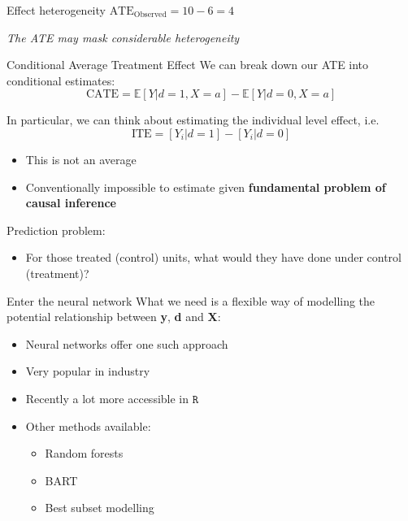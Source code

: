 \documentclass[
  ignorenonframetext,
]{beamer}
\providecommand{\tightlist}{%
  \setlength{\itemsep}{0pt}\setlength{\parskip}{0pt}}
\begin{document}
\begin{frame}{Effect heterogeneity}
\centering \(\text{ATE}_{\text{Observed}} = 10 - 6 = 4\)

\emph{The ATE may mask considerable heterogeneity}
\end{frame}

\begin{frame}{Conditional Average Treatment Effect}
\protect\hypertarget{conditional-average-treatment-effect}{}
We can break down our ATE into conditional estimates: \[
\text{CATE} = \mathbb{E}[Y|d = 1, X=a] - \mathbb{E}[Y|d = 0, X=a]
\]

In particular, we can think about estimating the individual level
effect, i.e. \[
\text{ITE} = [Y_i|d=1] - [Y_i|d = 0]
\]

\begin{itemize}
\tightlist
\item
  This is not an average
\item
  Conventionally impossible to estimate given \textbf{fundamental
  problem of causal inference}
\end{itemize}

Prediction problem:

\begin{itemize}
\tightlist
\item
  For those treated (control) units, what would they have done under
  control (treatment)?
\end{itemize}
\end{frame}

\begin{frame}{Enter the neural network}
\protect\hypertarget{enter-the-neural-network}{}
What we need is a flexible way of modelling the potential relationship
between \textbf{y}, \textbf{d} and \textbf{X}:

\begin{itemize}
\item
  Neural networks offer one such approach
\item
  Very popular in industry
\item
  Recently a lot more accessible in \(\texttt{R}\)
\item
  Other methods available:

  \begin{itemize}
  \tightlist
  \item
    Random forests
  \item
    BART
  \item
    Best subset modelling
  \end{itemize}
\end{itemize}
\end{frame}
\end{document}
